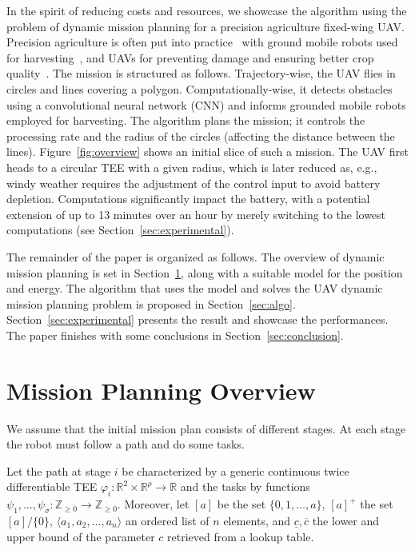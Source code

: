 \documentclass[letterpaper,10pt,conference]{ieeeconf}
\theoremstyle{definition}
\begin{document}
In the spirit of reducing costs and resources, we showcase the algorithm using the problem of dynamic mission planning for a precision agriculture fixed-wing UAV. Precision agriculture is often put into practice~\cite{hajjaj2014review} with ground mobile robots used for harvesting~\cite{qingchun2012study,dong2011development, de2011design, aljanobi2010setup, li2008analysis, edan2000robotic}, and UAVs for preventing damage and ensuring better crop quality~\cite{puri2017agriculture, daponte2019review}. The mission is structured as follows. Trajectory-wise, the UAV flies in circles and lines covering a polygon. Computationally-wise, it detects obstacles using a convolutional neural network (CNN) and informs grounded mobile robots employed for harvesting. The algorithm plans the mission; it controls the processing rate and the radius of the circles (affecting the distance between the lines). Figure~\ref{fig:overview} shows an initial slice of such a mission. The UAV first heads to a circular TEE with a given radius, which is later reduced as, e.g., windy weather requires the adjustment of the control input to avoid battery depletion. Computations significantly impact the battery, with a potential extension of up to 13 minutes over an hour by merely switching to the lowest computations (see Section~\ref{sec:experimental}).

The remainder of the paper is organized as follows. The overview of dynamic mission planning is set in Section~\ref{sec:prob}, along with a suitable model for the position and energy. The algorithm that uses the model and solves the UAV dynamic mission planning problem is proposed in Section~\ref{sec:algo}. Section~\ref{sec:experimental} presents the result and showcase the performances. The paper finishes with some conclusions in Section~\ref{sec:conclusion}.


\section{Mission Planning Overview}
\label{sec:prob}

We assume that the initial mission plan consists of different stages. At each stage the robot must follow a path and do some tasks.

Let the path at stage $i$ be characterized by a generic continuous twice differentiable TEE $\varphi_i:\mathbb{R}^2\times\mathbb{R}^\rho\rightarrow\mathbb{R}$ and the tasks by functions $\psi_1,\dots,\psi_{\sigma}:\mathbb{Z}_{\geq 0}\rightarrow\mathbb{Z}_{\geq 0}$. Moreover, let $[a]$ be the set $\{0,1,\dots,a\}$, $[a]^+$ the set $[a]/\{0\}$, $\langle a_1,a_2,...,a_n\rangle$ an ordered list of $n$ elements, and $\underline{c},\overline{c}$ the lower and upper bound of the parameter $c$ retrieved from a lookup table.
\end{document}

